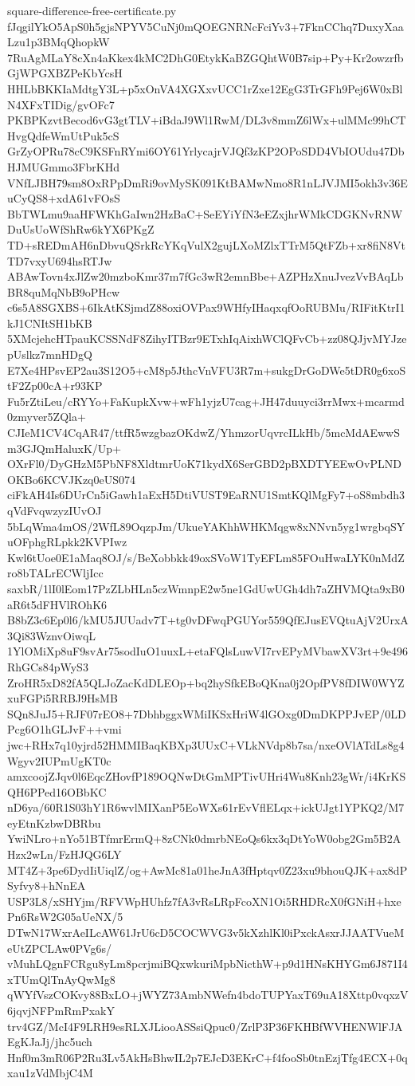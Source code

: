 \documentclass[11pt]{article}
\theoremstyle{definition}
\theoremstyle{remark}
\begin{document}
\begin{filecontents*}[overwrite]{square-difference-free-certificate.py}
fJqgilYkO5ApS0h5gjsNPYV5CuNj0mQOEGNRNcFciYv3+7FknCChq7DuxyXaaLzu1p3BMqQhopkW
7RuAgMLaY8cXn4aKkex4kMC2DhG0EtykKaBZGQhtW0B7sip+Py+Kr2owzrfbGjWPGXBZPeKbYcsH
HHLbBKKIaMdtgY3L+p5xOnVA4XGXxvUCC1rZxe12EgG3TrGFh9Pej6W0xBlN4XFxTIDig/gvOFc7
PKBPKzvtBecod6vG3gtTLV+iBdaJ9Wl1RwM/DL3v8mmZ6lWx+ulMMc99hCTHvgQdfeWmUtPuk5cS
GrZyOPRu78cC9KSFnRYmi6OY61YrlycajrVJQf3zKP2OPoSDD4VbIOUdu47DbHJMUGmmo3FbrKHd
VNfLJBH79sm8OxRPpDmRi9ovMySK091KtBAMwNmo8R1nLJVJMI5okh3v36EuCyQS8+xdA61vFOsS
BbTWLmu9aaHFWKhGaIwn2HzBaC+SeEYiYfN3eEZxjhrWMkCDGKNvRNWDuUsUoWfShRw6kYX6PKgZ
TD+sREDmAH6nDbvuQSrkRcYKqVulX2gujLXoMZlxTTrM5QtFZb+xr8fiN8VtTD7vxyU694hsRTJw
ABAwTovn4xJlZw20mzboKmr37m7fGc3wR2emnBbe+AZPHzXnuJvezVvBAqLbBR8quMqNbB9oPHcw
c6s5A8SGXBS+6IkAtKSjmdZ88oxiOVPax9WHfyIHaqxqfOoRUBMu/RIFitKtrI1kJ1CNItSH1bKB
5XMcjehcHTpauKCSSNdF8ZihyITBzr9ETxhIqAixhWClQFvCb+zz08QJjvMYJzepUslkz7mnHDgQ
E7Xe4HPsvEP2au3S12O5+cM8p5JthcVnVFU3R7m+sukgDrGoDWe5tDR0g6xoStF2Zp00cA+r93KP
Fu5rZtiLeu/cRYYo+FaKupkXvw+wFh1yjzU7cag+JH47duuyci3rrMwx+mcarmd0zmyver5ZQla+
CJIeM1CV4CqAR47/ttfR5wzgbazOKdwZ/YhmzorUqvrcILkHb/5mcMdAEwwSm3GJQmHaluxK/Up+
OXrFl0/DyGHzM5PbNF8XldtmrUoK71kydX6SerGBD2pBXDTYEEwOvPLNDOKBo6KCVJKzq0eUS074
ciFkAH4Is6DUrCn5iGawh1aExH5DtiVUST9EaRNU1SmtKQlMgFy7+oS8mbdh3qVdFvqwzyzIUvOJ
5bLqWma4mOS/2WfL89OqzpJm/UkueYAKhhWHKMqgw8xNNvn5yg1wrgbqSYuOFphgRLpkk2KVPIwz
Kwl6tUoe0E1aMaq8OJ/s/BeXobbkk49oxSVoW1TyEFLm85FOuHwaLYK0nMdZro8bTALrECWljIcc
saxbR/1lI0lEom17PzZLbHLn5czWmnpE2w5ne1GdUwUGh4dh7aZHVMQta9xB0aR6t5dFHVlROhK6
B8bZ3c6Ep0l6/kMU5JUUadv7T+tg0vDFwqPGUYor559QfEJusEVQtuAjV2UrxA3Qi83WznvOiwqL
1YlOMiXp8uF9svAr75sodIuO1uuxL+etaFQlsLuwVI7rvEPyMVbawXV3rt+9e496RhGCs84pWyS3
ZroHR5xD82fA5QLJoZacKdDLEOp+bq2hySfkEBoQKna0j2OpfPV8fDIW0WYZxuFGPi5RRBJ9HsMB
SQn8JuJ5+RJF07rEO8+7DbhbggxWMiIKSxHriW4lGOxg0DmDKPPJvEP/0LDPcg6O1hGLJvF++vmi
jwc+RHx7q10yjrd52HMMIBaqKBXp3UUxC+VLkNVdp8b7sa/nxeOVlATdLs8g4Wgyv2IUPmUgKT0c
amxcoojZJqv0l6EqcZHovfP189OQNwDtGmMPTivUHri4Wu8Knh23gWr/i4KrKSQH6PPed16OBbKC
nD6ya/60R1S03hY1R6wvlMIXanP5EoWXs61rEvVflELqx+ickUJgt1YPKQ2/M7eyEtnKzbwDBRbu
YwiNLro+nYo51BTfmrErmQ+8zCNk0dmrbNEoQs6kx3qDtYoW0obg2Gm5B2AHzx2wLn/FzHJQG6LY
MT4Z+3pe6DydIiUiqlZ/og+AwMc81a01heJnA3fHptqv0Z23xu9bhouQJK+ax8dPSyfvy8+hNnEA
USP3L8/xSHYjm/RFVWpHUhfz7fA3vRsLRpFcoXN1Oi5RHDRcX0fGNiH+hxePn6RsW2G05aUeNX/5
DTwN17WxrAeILcAW61JrU6cD5COCWVG3v5kXzhlKl0iPxckAsxrJJAATVueMeUtZPCLAw0PVg6s/
vMuhLQgnFCRgu8yLm8pcrjmiBQxwkuriMpbNicthW+p9d1HNsKHYGm6J871I4xTUmQlTnAyQwMg8
qWYfVszCOKvy88BxLO+jWYZ73AmbNWefn4bdoTUPYaxT69uA18Xttp0vqxzV6jqvjNFPmRmPxakY
trv4GZ/McI4F9LRH9esRLXJLiooASSsiQpuc0/ZrlP3P36FKHBfWVHENWlFJAEgKJaJj/jhc5uch
Hnf0m3mR06P2Ru3Lv5AkHsBhwIL2p7EJcD3EKrC+f4fooSb0tnEzjTfg4ECX+0qxau1zVdMbjC4M

\end{filecontents*}
\end{document}
